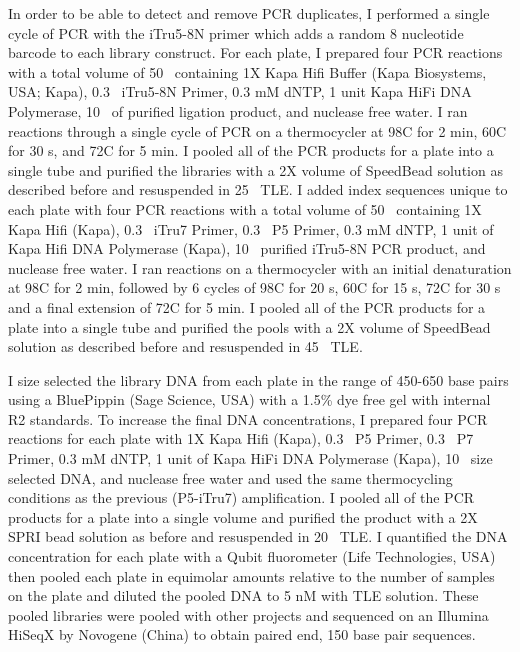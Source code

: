 In order to be able to detect and remove PCR duplicates, I performed a single   
cycle of PCR with the iTru5-8N primer which adds a random 8 nucleotide barcode to 
each library construct.  
For each plate, I prepared four PCR reactions with a total volume of 
50 \uL\ containing 1X Kapa Hifi Buffer (Kapa Biosystems, USA; Kapa),
0.3 \uM\ iTru5-8N Primer, 0.3 mM dNTP, 1 unit Kapa HiFi DNA Polymerase,
10 \uL\ of purified ligation product, and nuclease free water.
I ran reactions through a single cycle of PCR on a thermocycler at 98\degree C for 2 min, 
60\degree C for 30 s, and 72\degree C for 5 min. 
I pooled all of the PCR products for a plate into a single tube and purified the
libraries with a 2X volume of SpeedBead solution as described before and 
resuspended in 25 \uL\ TLE.
I added index sequences unique to each plate with four PCR
reactions with a total volume of 50 \uL\ containing 1X Kapa Hifi (Kapa),
0.3 \uM\ iTru7 Primer, 0.3 \uM\ P5 Primer, 0.3 mM dNTP, 1 unit of Kapa Hifi DNA Polymerase (Kapa),
10 \uL\ purified iTru5-8N PCR product, and nuclease free water.
I ran reactions on a thermocycler with an initial denaturation at 98\degree C for 2 min, 
followed by 6 cycles of 98\degree C for 20 s, 60\degree C for 15 s, 72\degree C 
for 30 s and a final extension of 72\degree C for 5 min.
I pooled all of the PCR products for a plate into a single tube and purified the
pools with a 2X volume of SpeedBead solution as described before and 
resuspended in 45 \uL\ TLE.

I size selected the library DNA from each plate in the range of 450-650 base pairs using
a BluePippin (Sage Science, USA) with a 1.5\% dye free gel with internal R2 standards. 
To increase the final DNA concentrations, I prepared four PCR reactions for each 
plate with 1X Kapa Hifi (Kapa), 0.3 \uM\ P5 Primer, 0.3 \uM\ P7 Primer, 0.3 mM dNTP, 
1 unit of Kapa HiFi DNA Polymerase (Kapa), 10 \uL\ size selected DNA, and 
nuclease free water and used the same thermocycling conditions as the previous
(P5-iTru7) amplification.
I pooled all of the PCR products for a plate into a single volume and purified 
the product with a 2X SPRI bead solution as before and resuspended in 20 \uL\ TLE. 
I quantified the DNA concentration for each plate with a Qubit fluorometer 
(Life Technologies, USA) then pooled each plate in equimolar amounts relative 
to the number of samples on the plate and diluted the pooled DNA to 5 nM with
TLE solution. 
These pooled libraries were pooled with other projects and sequenced on an Illumina 
HiSeqX by Novogene (China) to obtain paired end, 150 base pair sequences. 

